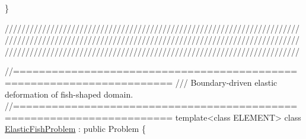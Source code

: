 \begin{DoxyCodeInclude}
\}

\textcolor{comment}{}
\textcolor{comment}{///////////////////////////////////////////////////////////////////////}
\textcolor{comment}{///////////////////////////////////////////////////////////////////////}
\textcolor{comment}{///////////////////////////////////////////////////////////////////////}
\textcolor{comment}{}


\textcolor{comment}{//====================================================================== }\textcolor{comment}{}
\textcolor{comment}{/// Boundary-driven elastic deformation of fish-shaped domain.}
\textcolor{comment}{}\textcolor{comment}{//====================================================================== }
\textcolor{keyword}{template}<\textcolor{keyword}{class} ELEMENT>
\textcolor{keyword}{class }\hyperlink{classElasticFishProblem}{ElasticFishProblem} : \textcolor{keyword}{public} Problem
\{


\end{DoxyCodeInclude}
